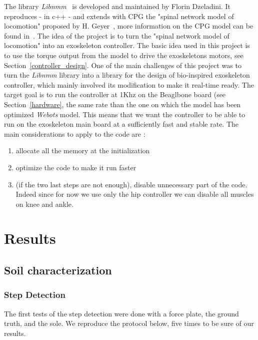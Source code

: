 \documentclass[a4paper,12pt]{article}
\begin{document}
The library \textit{Libnmm}~\cite{libnmm} is developed and maintained by Florin Dzeladini. It reproduces - in c++ - and extends with CPG the "spinal network model of locomotion" proposed by H. Geyer~\cite{geyer2010muscle}, more information on the CPG model can be found in~\cite{dzeladini2014contribution}. The idea of the project is to turn the "spinal network model of locomotion" into an exoskeleton controller. The basic idea used in this project is to use the torque output from the model to drive the exoskeletons motors, see Section~\ref{controller_design}. One of the main challenges of this project was to turn the \textit{Libnmm} library into a library for the design of bio-inspired exoskeleton controller, which mainly involved its modification to make it real-time ready.  The target goal is to run the controller at 1Khz on the Beaglbone board (see Section~\ref{hardware}, the same rate than the one on which the model has been optimized \textit{Webots} model. This means that we want the controller to be able to run on the exoskeleton main board at a sufficiently fast and stable rate. The main considerations to apply to the code are :
\begin{enumerate}
	\item allocate all the memory at the initialization 
    \item optimize the code to make it run faster 
    \item (if the two last steps are not enough), disable unnecessary part of the code. Indeed since for now we use only the hip controller we can disable all muscles on knee and ankle. 
\end{enumerate}

\section{Results}

\subsection{Soil characterization}

\subsubsection{Step Detection}

The first tests of the step detection were done with a force plate, the ground truth, and the sole. We reproduce the protocol below, five times to be sure of our results.\\
\end{document}
